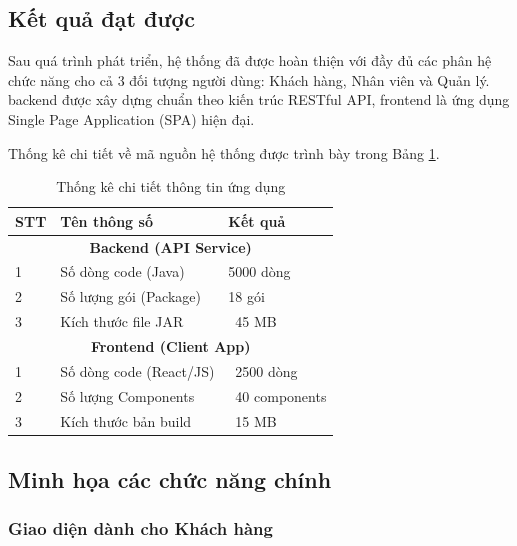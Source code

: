 \documentclass[../20232006p.tex]{subfiles}
\begin{document}
\subsection{Kết quả đạt được}
Sau quá trình phát triển, hệ thống đã được hoàn thiện với đầy đủ các phân hệ chức năng cho cả 3 đối tượng người dùng: Khách hàng, Nhân viên và Quản lý. backend được xây dựng chuẩn theo kiến trúc RESTful API, frontend là ứng dụng Single Page Application (SPA) hiện đại.

Thống kê chi tiết về mã nguồn hệ thống được trình bày trong Bảng \ref{tab:code_stats}.

\begin{table}[H]
    \centering
    \caption{Thống kê chi tiết thông tin ứng dụng}
    \label{tab:code_stats}
    \begin{tabular}{|p{1cm}|p{5cm}|p{4cm}|}
        \hline
        \textbf{STT} & \textbf{Tên thông số}   & \textbf{Kết quả} \\
        \hline
        \multicolumn{3}{|c|}{\textbf{Backend (API Service)}}      \\
        \hline
        1            & Số dòng code (Java)     & 5000 dòng        \\
        \hline
        2            & Số lượng gói (Package)  & 18 gói           \\
        \hline
        3            & Kích thước file JAR     & ~45 MB           \\
        \hline
        \multicolumn{3}{|c|}{\textbf{Frontend (Client App)}}      \\
        \hline
        1            & Số dòng code (React/JS) & ~2500 dòng       \\
        \hline
        2            & Số lượng Components     & ~40 components   \\
        \hline
        3            & Kích thước bản build    & ~15 MB           \\
        \hline
    \end{tabular}
\end{table}

\subsection{Minh họa các chức năng chính}

\subsubsection{Giao diện dành cho Khách hàng}
\end{document}
